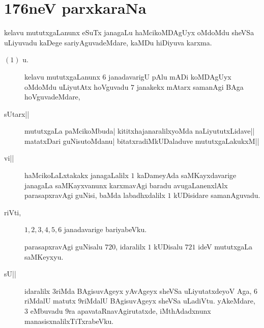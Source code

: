 \chapter{176neV parxkaraNa}


kelavu mututxgaLanunx eSuTx janagaLu haMcikoMDAgUyx oMdoMdu sheVSa
uLiyuvadu kaDege sariyAguvadeMdare, kaMDu hiDiyuva karxma.

\begin{description}
\item[$(1)$ u.] kelavu mututxgaLanunx $6$ janadavarigU pAlu mADi
  koMDAgUyx oMdoMdu uLiyutAtx hoVguvadu $7$ janakekx mAtarx samanAgi
  BAga hoVguvadeMdare,

\item[sUtarx||] mututxgaLa paMcikoMbuda| kititxhajanaralilxyoMda
  naLiyututxLidave|| matatxDari guNisutoMdanu| bitatxradiM\-kUDaladuve
  mututxgaLakukxM||

\item[vi||] haMcikoLaLxtakakx janagaLalilx $1$ kaDameyAda
  saMKayxdavarige janagaLa saMKayxvanunx karxmavAgi baradu
  avugaLanenxlAlx parasapxravAgi guNisi, baMda labadhxdalilx $1$
  kUDisidare samanAguvadu.

\item[riVti,] $1, 2, 3, 4, 5, 6$ janadavarige bariyabeVku.

  parasapxravAgi guNisalu $720$, idaralilx $1$ kUDisalu $721$ ideV
  mututxgaLa saMKeyxyu.

\item[sU||] idaralilx $3$riMda BAgisuvAgeyx yAvAgeyx sheVSa
  uLiyutatxdeyoV Aga, $6$riMdalU matutx $9$riMdalU BAgi\-suvAgeyx sheVSa
  uLadiVtu. yAkeMdare, $3$ eMbuvadu $9$ra apavataRnavAgirutatxde,
  iMthAdadxnunx manasisxnalilxTiTxrabeVku.
\end{description}
